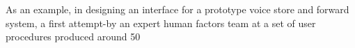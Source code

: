 As an example, in designing an interface for a prototype voice store and forward system, a first attempt-by an expert human factors team at a set of user procedures produced around 50%

